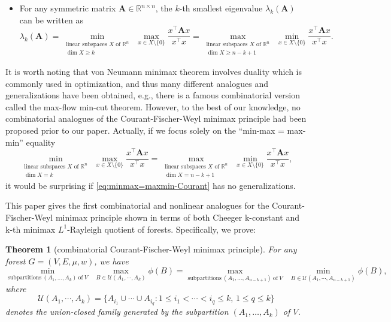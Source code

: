 \documentclass[12pt, reqno]{article}
\newtheorem{theorem}{Theorem}
\begin{document}
\begin{itemize}
\item For any symmetric matrix $\mathbf{A}\in \mathbb{R}^{n\times n}$, the $k$-th smallest eigenvalue $\lambda_k(\mathbf{A})$ can be written as 
$$ \lambda_k(\mathbf{A})=\min_{\substack{\text{linear subspaces }X\text{ of }\mathbb R^n\\\dim X\ge k}}~\max_{x\in X\setminus\{0\}} \frac{x^\top \mathbf{A} x}{x^\top x} = \max_{\substack{\text{linear subspaces }X\text{ of }\mathbb R^n\\\dim X\ge n-k+1}}~\min_{x\in X\setminus\{0\}} \frac{x^\top \mathbf{A} x}{x^\top x}.$$
\end{itemize}

It is worth noting that von Neumann minimax theorem involves duality which is commonly used in optimization, and thus many different analogues and generalizations have been obtained, e.g., there is a famous combinatorial version called the max-flow min-cut theorem. However, to the best of our knowledge, no combinatorial analogues of the Courant-Fischer-Weyl minimax principle had been proposed prior to our paper. 
Actually, if we focus solely on the ``min-max = max-min'' equality %
\begin{equation}\label{eq:minmax=maxmin-Courant}
\min_{\substack{\text{linear subspaces }X\text{ of }\mathbb R^n\\\dim X= k}}~\max_{x\in X\setminus\{0\}} \frac{x^\top \mathbf{A} x}{x^\top x} = \max_{\substack{\text{linear subspaces }X\text{ of }\mathbb R^n\\\dim X= n-k+1}}~\min_{x\in X\setminus\{0\}} \frac{x^\top \mathbf{A} x}{x^\top x},   
\end{equation}
it would be surprising if \eqref{eq:minmax=maxmin-Courant} has no generalizations. %

This paper gives the first combinatorial and nonlinear analogues for the Courant-Fischer-Weyl minimax principle shown in terms of both Cheeger k-constant and k-th minimax $L^1$-Rayleigh quotient of forests. Specifically, we prove:
\begin{theorem}[combinatorial Courant-Fischer-Weyl minimax principle]\label{thm:CombinatorialCourant-Fischer}
For any forest $G=(V,E,\mu,w)$, we have \[\min_{\mathrm{subpartitions~}(A_1,\dots,A_{k})\mathrm{~of~}V}~~\max_{B\in \mathcal{U}(A_1,\cdots,A_{k})}\phi(B)=\max_{\mathrm{subpartitions~}(A_1,\dots,A_{n-k+1})\mathrm{~of~}V}~~\min_{B\in \mathcal{U}(A_1,\cdots,A_{n-k+1})}\phi(B),\]
where \[\mathcal{U}(A_1,\cdots,A_k)=\{A_{i_1}\cup\cdots\cup A_{i_q}:1\le i_1<\cdots<i_q\le k,\,1\le q\le k\}\] denotes the union-closed family generated by the subpartition $(A_1,\dots,A_{k})$ of $V$.
\end{theorem}
\end{document}
